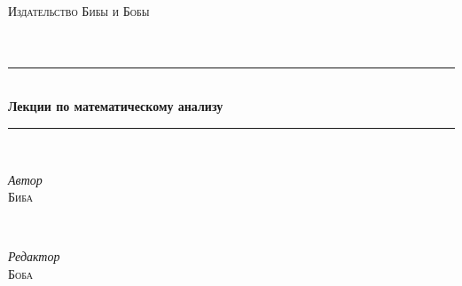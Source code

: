 \documentclass[a4paper,oneside]{article}
\theoremstyle{definition}
\theoremstyle{definition}
\theoremstyle{definition}
\begin{document}

\begin{titlepage} %
	\newcommand{\HRule}{\rule{\linewidth}{0.5mm}} %
	
	\center %
	
	
	\textsc{\LARGE Издательство Бибы и Бобы}\\[1.5cm] %
	
	\textsc{\Large }\\[0.5cm] %
	
	\textsc{\large }\\[0.5cm] %
	
	
	\HRule\\[0.4cm]
	
	{\huge\bfseries Лекции по математическому анализу}\\[0.4cm] %
	
	\HRule\\[1.5cm]
	
	
	\begin{minipage}{0.4\textwidth}
		\begin{flushleft}
			\large
			\textit{Автор}\\
			\textsc{Биба} %
		\end{flushleft}
	\end{minipage}
	~
	\begin{minipage}{0.4\textwidth}
		\begin{flushright}
			\large
			\textit{Редактор}\\
			\textsc{Боба} %
		\end{flushright}
	\end{minipage}
	

\end{titlepage}
\end{document}
